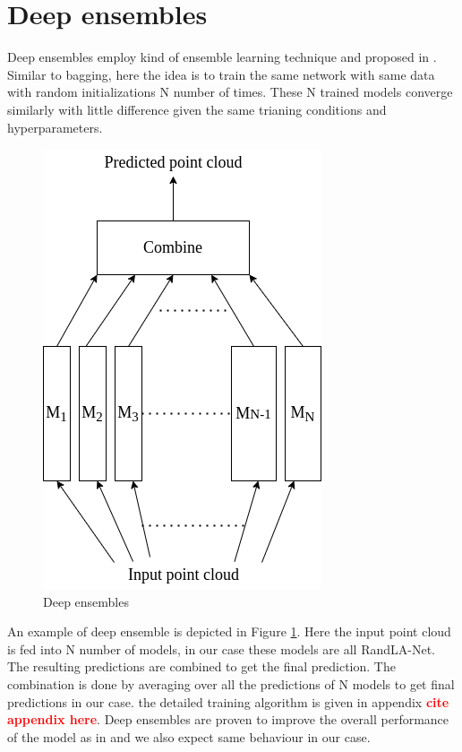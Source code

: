 \section{Deep ensembles}
Deep ensembles employ kind of ensemble learning technique and proposed in \cite{lakshminarayanan2016simple}.
Similar to bagging, here the idea is to train the same network with same data with random initializations N number of times.
These N trained models converge similarly with little difference given the same trianing conditions and hyperparameters.
\begin{figure}
    \centering
    \includegraphics[scale=0.5]{images/Ensembles.png}
    \caption{Deep ensembles}
    \label{fig:deepensembles}
\end{figure}
An example of deep ensemble is depicted in Figure \ref{fig:deepensembles}.
Here the input point cloud is fed into N number of models, in our case these models are all RandLA-Net.
The resulting predictions are combined to get the final prediction. 
The combination is done by averaging over all the predictions of N models to get final predictions in our case.
the detailed training algorithm is given in appendix \textcolor{red}{\textbf{cite appendix here}}.
Deep ensembles are proven to improve the overall performance of the model as in \cite{bhandary2020evaluating} and we also expect same behaviour in our case.

